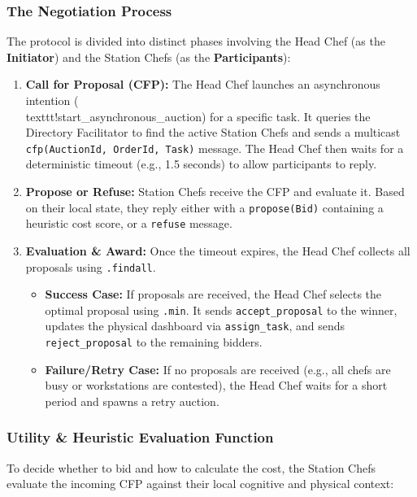 \documentclass{scrartcl}
\begin{document}
\subsubsection{The Negotiation Process}

The protocol is divided into distinct phases involving the Head Chef (as the \textbf{Initiator}) and the Station Chefs (as the \textbf{Participants}):

\begin{enumerate}
\item \textbf{Call for Proposal (CFP):} The Head Chef launches an asynchronous intention (\\texttt{!start\_asynchronous\_auction}) for a specific task. It queries the Directory Facilitator to find the active Station Chefs and sends a multicast \texttt{cfp(AuctionId, OrderId, Task)} message. The Head Chef then waits for a deterministic timeout (e.g., 1.5 seconds) to allow participants to reply.
   
\item \textbf{Propose or Refuse:} Station Chefs receive the CFP and evaluate it. Based on their local state, they reply either with a \texttt{propose(Bid)} containing a heuristic cost score, or a \texttt{refuse} message.

\item \textbf{Evaluation \& Award:} Once the timeout expires, the Head Chef collects all proposals using \texttt{.findall}.
\begin{itemize}
   \item \textbf{Success Case:} If proposals are received, the Head Chef selects the optimal proposal using \texttt{.min}. It sends \texttt{accept\_proposal} to the winner, updates the physical dashboard via \texttt{assign\_task}, and sends \texttt{reject\_proposal} to the remaining bidders.
   \item \textbf{Failure/Retry Case:} If no proposals are received (e.g., all chefs are busy or workstations are contested), the Head Chef waits for a short period and spawns a retry auction.
\end{itemize}   
\end{enumerate}


\subsubsection{Utility \& Heuristic Evaluation Function}

To decide whether to bid and how to calculate the cost, the Station Chefs evaluate the incoming CFP against their local cognitive and physical context:
\end{document}
